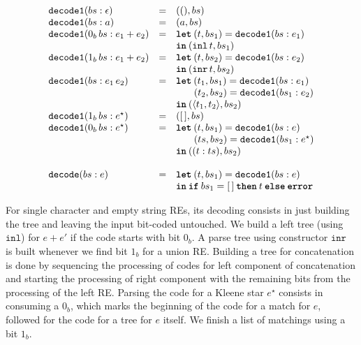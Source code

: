 \documentclass[review]{elsarticle}
\newcommand{\inl}{\ensuremath{\texttt{inl}}}
\newcommand{\inr}{\ensuremath{\texttt{inr}}}
\newcommand{\decodee}{\ensuremath{\texttt{decode}}}
\newcommand{\decodeo}{\ensuremath{\texttt{decode1}}}
\newcommand{\leti}{\ensuremath{\textbf{\texttt{let}}}}
\newcommand{\iin}{\ensuremath{\textbf{\texttt{in}}}}
\newcommand{\iif}{\ensuremath{\textbf{\texttt{if}}}}
\newcommand{\tthen}{\ensuremath{\textbf{\texttt{then}}}}
\newcommand{\eelse}{\ensuremath{\textbf{\texttt{else}}}}
\newcommand{\eerror}{\ensuremath{\textbf{\texttt{error}}}}
\theoremstyle{definition}
\begin{document}
\[
\begin{array}{lcl}
  \decodeo (bs : \epsilon) & = & ((), bs) \\
  \decodeo (bs : a)        & = & (a , bs) \\
  \decodeo (0_b\,bs : e_1 + e_2) & = & \leti\:(t,bs_1) = \decodeo (bs : e_1)\\
                                 &   & \iin\:(\inl\,t,bs_1)\\ 
  \decodeo (1_b\,bs : e_1 + e_2) & = & \leti\:(t,bs_2) = \decodeo (bs : e_2)\\
                                 &   & \iin\:(\inr\,t,bs_2)\\ 
  \decodeo (bs : e_1\,e_2) & = & \leti\:(t_1,bs_1) = \decodeo(bs : e_1) \\
                           &   & \,\,\,\,\,\,\,\,\,\,\,(t_2,bs_2) = \decodeo(bs_1 : e_2)\\
                           &   & \iin\:(\langle t_1,t_2\rangle, bs_2)\\
  \decodeo (1_b\,bs : e^\star) & = & ([\,],bs)\\
  \decodeo (0_b\,bs : e^\star) & = & \leti\:(t,bs_1) = \decodeo (bs : e)\\
                               &   & \,\,\,\,\,\,\,\,\,\,\,(ts,bs_2) = \decodeo(bs_1 : e ^\star) \\ 
                               &   & \iin\: ((t : ts), bs_2)\\
  \\
  \decodee (bs : e) & = & \leti\:(t,bs_1) = \decodeo(bs : e)\\
                    &   & \iin\:\iif\:bs_1 = [\,]\:\tthen\:t\:\eelse\:\eerror \\
\end{array}
\]

For single character and empty string REs, its decoding consists in just building
the tree and leaving the input bit-coded untouched. We build a left tree (using \inl)
for $e + e'$ if the code starts with bit $0_b$. A parse tree using constructor \inr~ is built
whenever we find bit $1_b$ for a union RE. Building a tree for concatenation is done by
sequencing the processing of codes for left component of concatenation and starting the
processing of right component with the remaining bits from the processing of the
left RE. Parsing the code for a Kleene star $e^\star$ consists in consuming a $0_b$, which
marks the beginning of the code for a match for $e$, followed for the code for a
tree for $e$ itself. We finish a list of matchings using a bit $1_b$.
\end{document}
